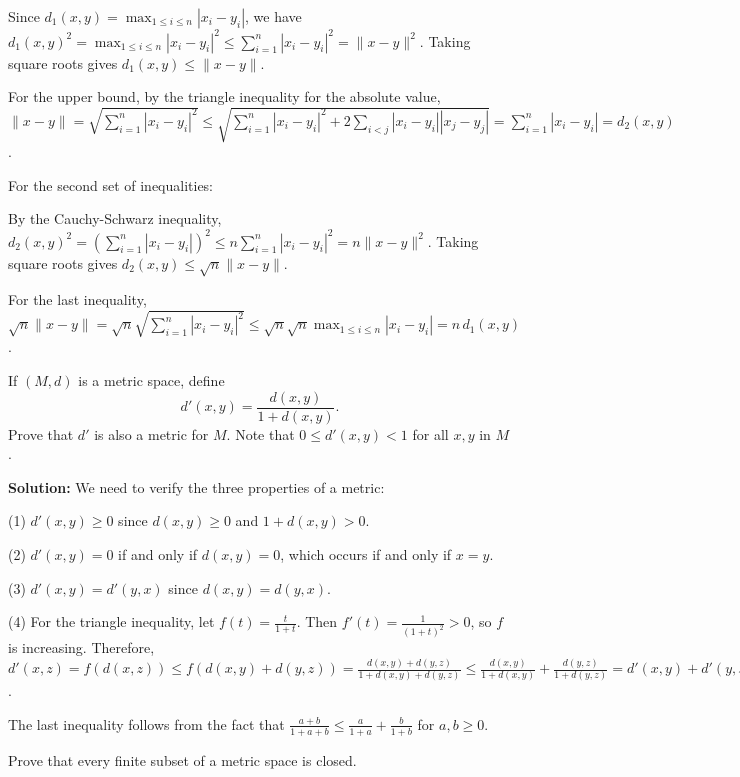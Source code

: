 Since $d_1(x,y) = \max_{1 \leq i \leq n} |x_i - y_i|$, we have $d_1(x,y)^2 = \max_{1 \leq i \leq n} |x_i - y_i|^2 \leq \sum_{i=1}^n |x_i - y_i|^2 = \|x-y\|^2$. Taking square roots gives $d_1(x,y) \leq \|x-y\|$.

For the upper bound, by the triangle inequality for the absolute value, $\|x-y\| = \sqrt{\sum_{i=1}^n |x_i - y_i|^2} \leq \sqrt{\sum_{i=1}^n |x_i - y_i|^2 + 2\sum_{i < j} |x_i - y_i||x_j - y_j|} = \sum_{i=1}^n |x_i - y_i| = d_2(x,y)$.

For the second set of inequalities:

By the Cauchy-Schwarz inequality, $d_2(x,y)^2 = (\sum_{i=1}^n |x_i - y_i|)^2 \leq n\sum_{i=1}^n |x_i - y_i|^2 = n\|x-y\|^2$. Taking square roots gives $d_2(x,y) \leq \sqrt{n}\|x-y\|$.

For the last inequality, $\sqrt{n}\|x-y\| = \sqrt{n}\sqrt{\sum_{i=1}^n |x_i - y_i|^2} \leq \sqrt{n}\sqrt{n}\max_{1 \leq i \leq n} |x_i - y_i| = n\,d_1(x,y)$.

\begin{problembox}
If \( (M, d) \) is a metric space, define
\[d'(x, y) = \frac{d(x, y)}{1 + d(x, y)}.\]
Prove that \( d' \) is also a metric for \( M \). Note that \( 0 \leq d'(x, y) < 1 \) for all \( x, y \) in \( M \).
\end{problembox}

\textbf{Solution:} We need to verify the three properties of a metric:

(1) $d'(x,y) \geq 0$ since $d(x,y) \geq 0$ and $1 + d(x,y) > 0$.

(2) $d'(x,y) = 0$ if and only if $d(x,y) = 0$, which occurs if and only if $x = y$.

(3) $d'(x,y) = d'(y,x)$ since $d(x,y) = d(y,x)$.

(4) For the triangle inequality, let $f(t) = \frac{t}{1+t}$. Then $f'(t) = \frac{1}{(1+t)^2} > 0$, so $f$ is increasing. Therefore, $d'(x,z) = f(d(x,z)) \leq f(d(x,y) + d(y,z)) = \frac{d(x,y) + d(y,z)}{1 + d(x,y) + d(y,z)} \leq \frac{d(x,y)}{1 + d(x,y)} + \frac{d(y,z)}{1 + d(y,z)} = d'(x,y) + d'(y,z)$.

The last inequality follows from the fact that $\frac{a+b}{1+a+b} \leq \frac{a}{1+a} + \frac{b}{1+b}$ for $a,b \geq 0$.

\begin{problembox}
Prove that every finite subset of a metric space is closed.
\end{problembox}

